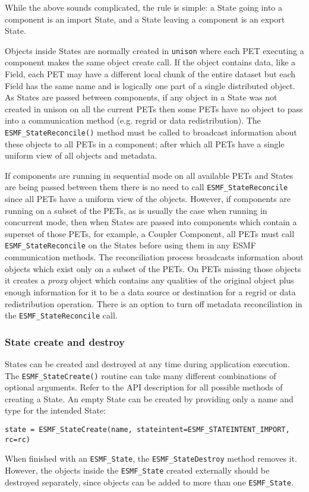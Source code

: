 While the above sounds complicated, the rule is simple:
a State going into a component is an import State, and a 
State leaving a component is an export State.

Objects inside States are normally created in {\tt unison} where
each PET executing a component makes the same object create call.
If the object contains data, like a Field, each PET may have a
different local chunk of the entire dataset but each Field has
the same name and is logically one part of a single distributed 
object.   As States are passed between components, if any object
in a State was not created in unison on all the current PETs 
then some PETs have no object to pass into a
communication method (e.g. regrid or data redistribution).
The {\tt ESMF\_StateReconcile()} method must be called to broadcast 
information about these objects to all PETs in a component;
after which all PETs have a single uniform view of all objects and metadata.  

If components are running in sequential mode on all available PETs
and States are being passed between them there is no need to call 
{\tt ESMF\_StateReconcile} since all PETs have a uniform view of the objects.
However, if components are running on a subset of the PETs, as is
usually the case when running in concurrent mode, then when States
are passed into components which contain a superset of those PETs,
for example, a Coupler Component, all PETs must call {\tt ESMF\_StateReconcile}
on the States before using them in any ESMF communication methods.
The reconciliation process broadcasts information about objects
which exist only on a subset of the PETs.  On PETs missing those
objects it creates a {\it proxy} object which contains any
qualities of the original object plus enough information for it
to be a data source or destination for a regrid or data redistribution
operation.  There is an option to turn off metadata reconciliation in the 
{\tt ESMF\_StateReconcile} call.

\subsubsection{State create and destroy}

States can be created and destroyed at any time during
application execution.  The {\tt ESMF\_StateCreate()} routine
can take many different combinations of optional arguments.  Refer
to the API description for all possible methods of creating a State.
An empty State can be created by providing only a name and type for
the intended State:

{\tt state = ESMF\_StateCreate(name, stateintent=ESMF\_STATEINTENT\_IMPORT, rc=rc)}

When finished with an {\tt ESMF\_State}, the {\tt ESMF\_StateDestroy} method
removes it.  However, the objects inside the {\tt ESMF\_State}
created externally should be destroyed separately,
since objects can be added to more than one {\tt ESMF\_State}.
